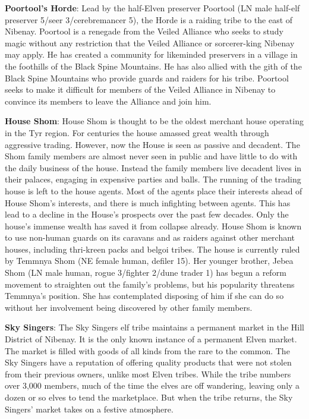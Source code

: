{
	\textbf{Poortool's Horde}: Lead by the half-Elven preserver Poortool (LN male half-elf preserver 5/seer 3/cerebremancer 5), the Horde is a raiding tribe to the east of Nibenay. Poortool is a renegade from the Veiled Alliance who seeks to study magic without any restriction that the Veiled Alliance or sorcerer-king Nibenay may apply. He has created a community for likeminded preservers in a village in the foothills of the Black Spine Mountains. He has also allied with the gith of the Black Spine Mountains who provide guards and raiders for his tribe. Poortool seeks to make it difficult for members of the Veiled Alliance in Nibenay to convince its members to leave the Alliance and join him.

	\textbf{House Shom}: House Shom is thought to be the oldest merchant house operating in the Tyr region. For centuries the house amassed great wealth through aggressive trading. However, now the House is seen as passive and decadent. The Shom family members are almost never seen in public and have little to do with the daily business of the house. Instead the family members live decadent lives in their palaces, engaging in expensive parties and balls. The running of the trading house is left to the house agents. Most of the agents place their interests ahead of House Shom's interests, and there is much infighting between agents. This has lead to a decline in the House's prospects over the past few decades. Only the house's immense wealth has saved it from collapse already. House Shom is known to use non-human guards on its caravans and as raiders against other merchant houses, including thri-kreen packs and belgoi tribes. The house is currently ruled by Temmnya Shom (NE female human, defiler 15). Her younger brother, Jebea Shom (LN male human, rogue 3/fighter 2/dune trader 1) has begun a reform movement to straighten out the family's problems, but his popularity threatens Temmnya's position. She has contemplated disposing of him if she can do so without her involvement being discovered by other family members.

	\textbf{Sky Singers}: The Sky Singers elf tribe maintains a permanent market in the Hill District of Nibenay. It is the only known instance of a permanent Elven market. The market is filled with goods of all kinds from the rare to the common. The Sky Singers have a reputation of offering quality products that were not stolen from their previous owners, unlike most Elven tribes. While the tribe numbers over 3,000 members, much of the time the elves are off wandering, leaving only a dozen or so elves to tend the marketplace. But when the tribe returns, the Sky Singers' market takes on a festive atmosphere.

}
